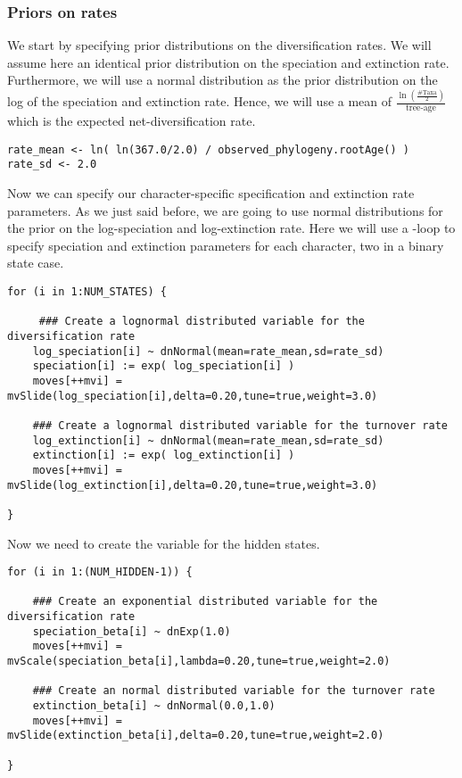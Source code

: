 \subsubsection{Priors on rates}
We start by specifying prior distributions on the diversification rates.
We will assume here an identical prior distribution on the speciation and extinction rate.
Furthermore, we will use a normal distribution as the prior distribution on the log of the speciation and extinction rate.
Hence, we will use a mean of $\frac{\ln(\frac{\text{\#Taxa}}{2})}{\text{tree-age}}$ which is the expected net-diversification rate.
{\tt \begin{snugshade*}
\begin{lstlisting}
rate_mean <- ln( ln(367.0/2.0) / observed_phylogeny.rootAge() )
rate_sd <- 2.0
\end{lstlisting}
\end{snugshade*}}
Now we can specify our character-specific specification and extinction rate parameters.
As we just said before, we are going to use normal distributions for the prior on the log-speciation and log-extinction rate.
Here we will use a -loop to specify speciation and extinction parameters for each character, \EG two in a binary state case.
{\tt \begin{snugshade*}
\begin{lstlisting}
for (i in 1:NUM_STATES) {
    
     ### Create a lognormal distributed variable for the diversification rate
    log_speciation[i] ~ dnNormal(mean=rate_mean,sd=rate_sd) 
    speciation[i] := exp( log_speciation[i] )
    moves[++mvi] = mvSlide(log_speciation[i],delta=0.20,tune=true,weight=3.0)

    ### Create a lognormal distributed variable for the turnover rate
    log_extinction[i] ~ dnNormal(mean=rate_mean,sd=rate_sd) 
    extinction[i] := exp( log_extinction[i] )
    moves[++mvi] = mvSlide(log_extinction[i],delta=0.20,tune=true,weight=3.0)

}
\end{lstlisting}
\end{snugshade*}}
Now we need to create the variable for the hidden states.
{\tt \begin{snugshade*}
\begin{lstlisting}
for (i in 1:(NUM_HIDDEN-1)) {
    
    ### Create an exponential distributed variable for the diversification rate
    speciation_beta[i] ~ dnExp(1.0) 
    moves[++mvi] = mvScale(speciation_beta[i],lambda=0.20,tune=true,weight=2.0)        

    ### Create an normal distributed variable for the turnover rate
    extinction_beta[i] ~ dnNormal(0.0,1.0)
    moves[++mvi] = mvSlide(extinction_beta[i],delta=0.20,tune=true,weight=2.0)
    
}
\end{lstlisting}
\end{snugshade*}}

